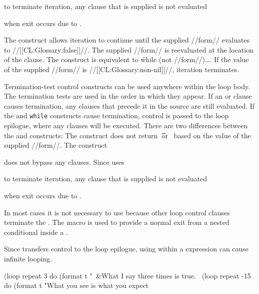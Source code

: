 to terminate iteration, any  clause that is supplied is not evaluated

when exit occurs due to .
  \endlist
 
 
  The  construct allows iteration to continue until the  supplied //form//  evaluates to //[[CL:Glossary:false]]//.  The supplied //form//  is reevaluated at the location of the  clause.
  The  construct is equivalent to  \f{while (not //form//)\dots}.  If the value of the supplied //form// is //[[CL:Glossary:non-nil]]//, iteration terminates.

Termination-test control constructs can be used anywhere within the loop body. The termination tests are used in the order in which they appear. If an  or  clause causes termination, any clauses that precede it in the source are still evaluated.   If the  and {\tt while} constructs cause termination, control is passed to the loop epilogue, where any  clauses will be executed.  
  There are two differences between the  and  constructs: 
  \beginlist \itemitem{\bull} The  construct does not return  \t\ or \nil\ based on the value of the supplied //form//.
                                                        \itemitem{\bull}  The  construct 

does not bypass any  clauses. Since  uses   

to terminate iteration, any  clause that is supplied is not evaluated

when exit occurs due to .  \endlist

In most cases it is not necessary to use  because other loop control clauses terminate the .   The macro  is used to provide a normal exit from a nested conditional inside a .

Since  transfers control to the loop epilogue, using  within a  expression can cause infinite looping.

  \code
 (loop repeat 3
       do (format t "~&What I say three times is true.~%
 (loop repeat -15
   do (format t "What you see is what you expect~%
  \endsubsubsection%

